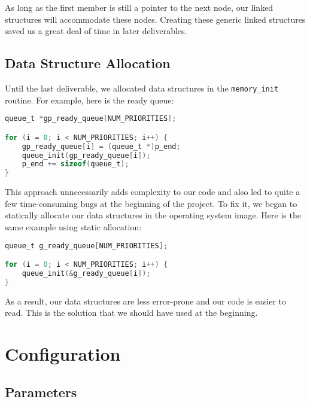 \documentclass[12pt]{report}
\begin{document}
As long as the first member is still a pointer to the next node, our linked structures will accommodate these nodes. Creating these generic linked structures saved us a great deal of time in later deliverables.

\section{Data Structure Allocation}

Until the last deliverable, we allocated data structures in the \texttt{memory_init} routine. For example, here is the ready queue:

\begin{minipage}{\textwidth}
\begin{lstlisting}[language=C, frame=single]
queue_t *gp_ready_queue[NUM_PRIORITIES];

for (i = 0; i < NUM_PRIORITIES; i++) {
    gp_ready_queue[i] = (queue_t *)p_end;
    queue_init(gp_ready_queue[i]);
    p_end += sizeof(queue_t);
}
\end{lstlisting}
\end{minipage}

This approach unnecessarily adds complexity to our code and also led to quite a few time-consuming bugs at the beginning of the project. To fix it, we began to statically allocate our data structures in the operating system image. Here is the same example using static allocation:

\begin{minipage}{\textwidth}
\begin{lstlisting}[language=C, frame=single]
queue_t g_ready_queue[NUM_PRIORITIES];

for (i = 0; i < NUM_PRIORITIES; i++) {
    queue_init(&g_ready_queue[i]);
}
\end{lstlisting}
\end{minipage}

As a result, our data structures are less error-prone and our code is easier to read. This is the solution that we should have used at the beginning.

\appendix


\chapter{Configuration}
\label{app:configuration}

\section{Parameters}
\end{document}
